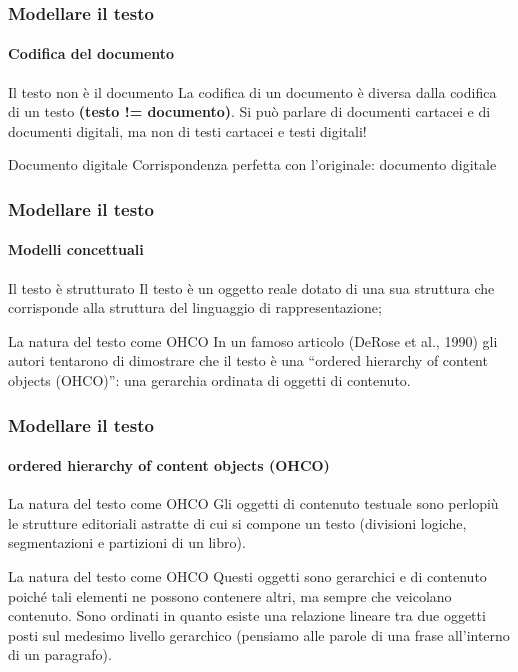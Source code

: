 \begin{frame}
	\frametitle{Modellare il testo}
	\framesubtitle{Codifica del documento}
	\addtocounter{nframe}{1}

	\begin{block}{Il testo non è il documento}
		La codifica di un documento è diversa dalla codifica di un
		testo \textbf{(testo != documento)}. Si può parlare di documenti cartacei e di documenti
		digitali, ma non di testi cartacei e testi digitali!
	\end{block}

	\begin{block}{Documento digitale}
		Corrispondenza perfetta con l'originale: documento digitale
	\end{block}


\end{frame}


\begin{frame}
	\frametitle{Modellare il testo}
	\framesubtitle{Modelli concettuali}
	\addtocounter{nframe}{1}

	\begin{block}{Il testo è strutturato}
		Il testo è un oggetto reale dotato di una sua struttura che corrisponde alla struttura del linguaggio di rappresentazione;
	\end{block}

	\begin{block}{La natura del testo come OHCO}
		In un famoso articolo (DeRose et al., 1990) gli autori tentarono di dimostrare che il testo è una ``ordered hierarchy of content objects (OHCO)'': una gerarchia ordinata di oggetti di contenuto.
	\end{block}
\end{frame}


\begin{frame}
	\frametitle{Modellare il testo}
	\framesubtitle{ordered hierarchy of content objects (OHCO)}
	\addtocounter{nframe}{1}

	\begin{block}{La natura del testo come OHCO}
		Gli oggetti di contenuto testuale sono perlopiù le strutture editoriali astratte di cui si compone un testo (divisioni logiche, segmentazioni e partizioni di un libro).
	\end{block}

	\begin{block}{La natura del testo come OHCO}
		Questi oggetti sono gerarchici e di contenuto poiché tali elementi ne possono contenere altri, ma sempre che veicolano contenuto.  Sono ordinati in quanto esiste una relazione lineare tra due oggetti posti sul medesimo livello gerarchico (pensiamo alle parole di una frase all'interno di un paragrafo).
	\end{block}
\end{frame}

